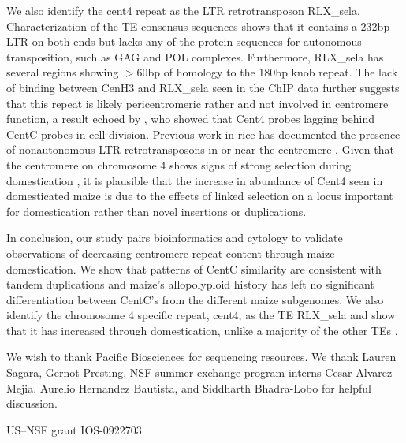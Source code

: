  We also identify the cent4 repeat as the LTR retrotransposon RLX\_sela.  Characterization of the TE consensus sequences shows that it contains a 232bp LTR on both ends but lacks any of the protein sequences for autonomous transposition, such as GAG and POL complexes.  Furthermore, RLX\_sela has several  regions showing $>60$bp of homology to the 180bp knob repeat. The lack of binding between CenH3 and RLX\_sela seen in the ChIP data further suggests that this repeat is likely pericentromeric rather and not involved in centromere function, a result echoed by  \citet{Jin2004}, who showed that Cent4 probes lagging behind CentC probes in cell division. Previous work in rice has documented the presence of nonautonomous LTR retrotransposons  in or near the centromere \citep{Jiang2002}.  Given that the centromere on chromosome 4 shows signs of strong selection during domestication \citep{Hufford2012}  , it is plausible that the increase in abundance of Cent4 seen in domesticated maize is due to the effects of linked selection on a locus important for domestication rather than novel insertions or duplications. 

In conclusion, our study pairs bioinformatics and cytology to validate observations of decreasing centromere repeat content through maize domestication.  We show that patterns of CentC similarity are consistent with tandem duplications and maize’s allopolyploid history has left no significant differentiation between CentC’s from the different maize subgenomes. We also identify the chromosome 4 specific repeat, cent4, as the TE RLX\_sela and show that it has increased through domestication, unlike a majority of the other TEs \citep{Chia2012}.    


\begin{acknowledgements}
We wish to thank Pacific Biosciences for sequencing resources.  We thank Lauren Sagara, Gernot Presting,  NSF summer exchange program interns Cesar Alvarez Mejia, Aurelio Hernandez Bautista, and Siddharth Bhadra-Lobo for helpful discussion.


US–NSF grant IOS-0922703

\end{acknowledgements}

